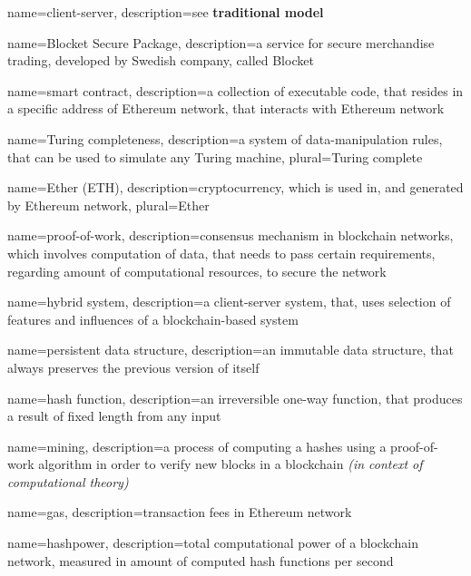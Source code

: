 {
    name=client-server,
    description={see \textbf{traditional model}}
}

{
    name=Blocket Secure Package,
    description={a service for secure merchandise trading, developed by Swedish company, called Blocket}
}

{
    name=smart contract,
    description={a collection of executable code, that resides in a specific address of Ethereum network, that interacts with Ethereum network}
}

{
    name=Turing completeness,
    description={a system of data-manipulation rules, that can be used to simulate any Turing machine},
    plural={Turing complete}
}

{
    name=Ether (ETH),
    description={cryptocurrency, which is used in, and generated by Ethereum network},
    plural=Ether
}

{
    name=proof-of-work,
    description={consensus mechanism in blockchain networks, which involves computation of data, that needs to pass certain requirements, regarding amount of computational resources, to secure the network}
}

{
    name=hybrid system,
    description={a client-server system, that, uses selection of features and influences of a blockchain-based system}
}

{
    name=persistent data structure,
    description={an immutable data structure, that always preserves the previous version of itself}
}

{
    name=hash function,
    description={an irreversible one-way function, that produces a result of fixed length from any input}
}

{
    name=mining,
    description={a process of computing a hashes using a proof-of-work algorithm in order to verify new blocks in a blockchain \textit{(in context of computational theory)}}
}

{
    name=gas,
    description={transaction fees in Ethereum network}
}

{
    name=hashpower,
    description={total computational power of a blockchain network, measured in amount of computed hash functions per second}
}

